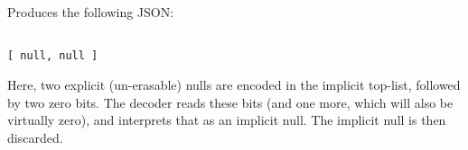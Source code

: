 Produces the following JSON:

\begin{changemargin}{-60mm}{0mm}
\begin{myquote}
\begin{verbatim}

[ null, null ]

\end{verbatim}
\end{myquote}
\end{changemargin}

Here, two explicit (un-erasable) nulls are encoded in the implicit
top-list, followed by two zero bits. The decoder reads these bits
(and one more, which will also be virtually zero), and interprets that
as an implicit null. The implicit null is then discarded.
